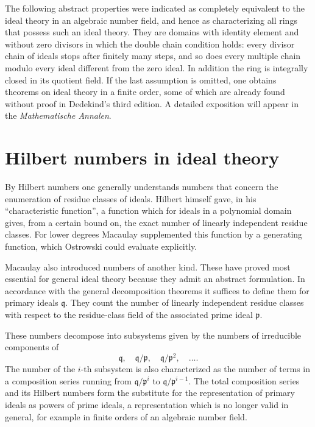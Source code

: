 \documentclass[11pt]{article}
\begin{document}
The following abstract properties were indicated as completely equivalent to the ideal theory in an algebraic number field, and hence as characterizing all rings that possess such an ideal theory. They are domains with identity element and without zero divisors in which the double chain condition holds: every divisor chain of ideals stops after finitely many steps, and so does every multiple chain modulo every ideal different from the zero ideal. In addition the ring is integrally closed in its quotient field. If the last assumption is omitted, one obtains theorems on ideal theory in a finite order, some of which are already found without proof in Dedekind's third edition. A detailed exposition will appear in the \emph{Mathematische Annalen}.

\section{Hilbert numbers in ideal theory}

By Hilbert numbers one generally understands numbers that concern the enumeration of residue classes of ideals. Hilbert himself gave, in his ``characteristic function'', a function which for ideals in a polynomial domain gives, from a certain bound on, the exact number of linearly independent residue classes. For lower degrees Macaulay supplemented this function by a generating function, which Ostrowski could evaluate explicitly.

Macaulay also introduced numbers of another kind. These have proved most essential for general ideal theory because they admit an abstract formulation. In accordance with the general decomposition theorems it suffices to define them for primary ideals $\mathfrak q$. They count the number of linearly independent residue classes with respect to the residue-class field of the associated prime ideal $\mathfrak p$.

These numbers decompose into subsystems given by the numbers of irreducible components of
\[
  \mathfrak q,
  \quad \mathfrak q/\mathfrak p,
  \quad \mathfrak q/\mathfrak p^2,
  \quad \ldots .
\]
The number of the $i$-th subsystem is also characterized as the number of terms in a composition series running from $\mathfrak q/\mathfrak p^i$ to $\mathfrak q/\mathfrak p^{i-1}$. The total composition series and its Hilbert numbers form the substitute for the representation of primary ideals as powers of prime ideals, a representation which is no longer valid in general, for example in finite orders of an algebraic number field.
\end{document}
